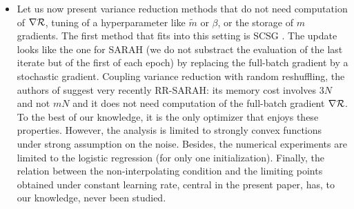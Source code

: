 \documentclass[article,authoryear,jmlmc]{beg_32}             %
\begin{document}
\begin{itemize}
\begin{equation*}
	g_n = \nR_{i_n}(\theta_n)-\nR_{i_n}(\theta_{n-1})+g_{n-1}
\end{equation*}
where every $\tilde{m}$ iterations, the estimation $g_n$ is the full batch gradient $\nR$. In the same family we find GEOM-SARAH \cite{GEOM_SARAH}, ZERO-SARAH (no computation of $\nR$ but introduction of a new hyperparameter and similar storage as SAG) \cite{ZERO_SARAH}, STORM (add an inertial hyperparameter $\beta$ to tune) \cite{STORM_first}, SPIDER (variance reduction on normalized gradient) \cite{SPIDER_first}, SSRGD (mix between SARAH and perturbed GD in order to escape more efficiently to saddle points) \cite{SSRGD}, PAGE (alternating between SARAH and SGD with some probability) \cite{PAGE}, Katyusha (acceleration on strongly convex functions) \cite{Katyusha}. 
\item Let us now present variance reduction methods that do not need computation of $\nR$, tuning of a hyperparameter like $\tilde{m}$ or $\beta$, or the storage of $m$ gradients.
  The first method that fits into this setting is SCSG \cite{SCSG}. The update looks like the one for SARAH (we do not substract the evaluation of the last iterate but of the first
    of each epoch) by replacing the full-batch gradient by a stochastic gradient. Coupling variance reduction with random reshuffling, the authors of \cite{RR_SARAH} suggest very
    recently RR-SARAH: its memory cost involves $3N$ and not $mN$ and it does not need computation of the full-batch gradient $\nR$. To the best of our knowledge, it is the only
    optimizer that enjoys these properties. However, the analysis is limited to strongly convex functions under strong assumption on the noise. Besides, the numerical experiments
    are limited to the logistic regression (for only one initialization). Finally, the relation between the non-interpolating condition and the limiting points obtained under
    constant learning rate, central in the present paper, has, to our knowledge, never been studied. 
\end{itemize}
\end{document}
